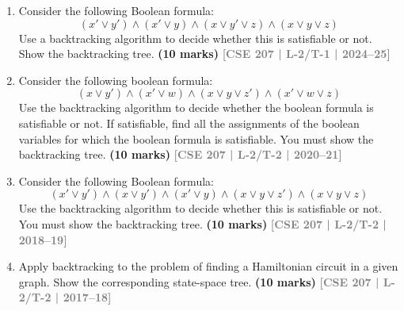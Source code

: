 \documentclass[12pt]{article}
\newcommand{\yr}[1]{\hfill\textcolor{gray}{\small\textbf{[#1]}}}
\newcommand{\mk}[1]{\textcolor{orange!70!black}{\small\textbf{(#1 marks)}}}
\begin{document}
\begin{enumerate}

\item Consider the following Boolean formula:
\[
  (x' \vee y') \wedge (x' \vee y) \wedge (x \vee y' \vee z) \wedge (x \vee y \vee z)
\]
Use a backtracking algorithm to decide whether this is satisfiable or not. Show the backtracking tree.
\mk{10} \yr{CSE 207 | L-2/T-1 | 2024--25}


\item Consider the following boolean formula:
\[
  (x \vee y') \wedge (x' \vee w) \wedge (x \vee y \vee z') \wedge (x' \vee w \vee z)
\]
Use the backtracking algorithm to decide whether the boolean formula is satisfiable or not. If satisfiable, find all the assignments of the boolean variables for which the boolean formula is satisfiable. You must show the backtracking tree.
\mk{10} \yr{CSE 207 | L-2/T-2 | 2020--21}


\item Consider the following Boolean formula:
\[
  (x' \vee y') \wedge (x \vee y') \wedge (x' \vee y) \wedge (x \vee y \vee z') \wedge (x \vee y \vee z)
\]
Use the backtracking algorithm to decide whether this is satisfiable or not. You must show the backtracking tree.
\mk{10} \yr{CSE 207 | L-2/T-2 | 2018--19}


\item Apply backtracking to the problem of finding a Hamiltonian circuit in a given graph. Show the corresponding state-space tree. \mk{10}
\yr{CSE 207 | L-2/T-2 | 2017--18}

\begin{center}
  
\end{center}
\end{enumerate}
\end{document}
